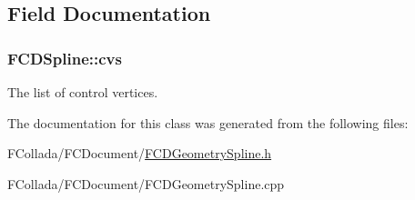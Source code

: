 \subsection{Field Documentation}
\hypertarget{classFCDSpline_a05d1e800f6a9036a4fcb48645f801e97}{
\subsubsection[{cvs}]{ {\bf FCDSpline::cvs}}}
\label{classFCDSpline_a05d1e800f6a9036a4fcb48645f801e97}
The list of control vertices. 

The documentation for this class was generated from the following files:\begin{DoxyCompactItemize}
\item 
FCollada/FCDocument/\hyperlink{FCDGeometrySpline_8h}{FCDGeometrySpline.h}\item 
FCollada/FCDocument/FCDGeometrySpline.cpp\end{DoxyCompactItemize}
